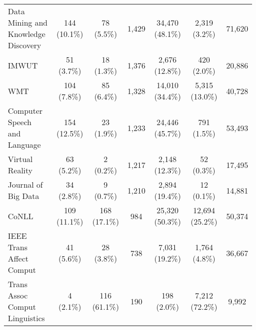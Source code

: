 \begin{tabular}{l|ccc|ccc}
\makecell[l]{Data Mining and \\ Knowledge Discovery} & 144 (10.1\%) & 78 (5.5\%) & 1,429 & 34,470 (48.1\%) & 2,319 (3.2\%) & 71,620 \\
IMWUT & 51 (3.7\%) & 18 (1.3\%) & 1,376 & 2,676 (12.8\%) & 420 (2.0\%) & 20,886 \\
WMT & 104 (7.8\%) & 85 (6.4\%) & 1,328 & 14,010 (34.4\%) & 5,315 (13.0\%) & 40,728 \\
\makecell[l]{Computer Speech \\ and Language} & 154 (12.5\%) & 23 (1.9\%) & 1,233 & 24,446 (45.7\%) & 791 (1.5\%) & 53,493 \\
Virtual Reality & 63 (5.2\%) & 2 (0.2\%) & 1,217 & 2,148 (12.3\%) & 52 (0.3\%) & 17,495 \\
Journal of Big Data & 34 (2.8\%) & 9 (0.7\%) & 1,210 & 2,894 (19.4\%) & 12 (0.1\%) & 14,881 \\
CoNLL & 109 (11.1\%) & 168 (17.1\%) & 984 & 25,320 (50.3\%) & 12,694 (25.2\%) & 50,374 \\
\makecell[l]{IEEE Trans \\ Affect Comput} & 41 (5.6\%) & 28 (3.8\%) & 738 & 7,031 (19.2\%) & 1,764 (4.8\%) & 36,667 \\
\makecell[l]{Trans Assoc \\ Comput Linguistics} & 4 (2.1\%) & 116 (61.1\%) & 190 & 198 (2.0\%) & 7,212 (72.2\%) & 9,992 \\
\bottomrule
\end{tabular}
